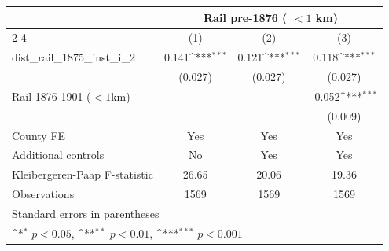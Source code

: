 {
\def\sym#1{\ifmmode^{#1}\else\(^{#1}\)\fi}
\begin{tabular}{l*{3}{c}}
\toprule
                &\multicolumn{3}{c}{Rail pre-1876 ( $<1$ km)}            \\\cmidrule(lr){2-4}
                &\multicolumn{1}{c}{(1)}         &\multicolumn{1}{c}{(2)}         &\multicolumn{1}{c}{(3)}         \\
\midrule
dist\_rail\_1875\_inst\_i\_2&    0.141\sym{***}&    0.121\sym{***}&    0.118\sym{***}\\
                &  (0.027)         &  (0.027)         &  (0.027)         \\
Rail 1876-1901 ($<1$km)&                  &                  &   -0.052\sym{***}\\
                &                  &                  &  (0.009)         \\
County FE       &      Yes         &      Yes         &      Yes         \\
Additional controls &       No         &      Yes         &      Yes         \\
\midrule
Kleibergeren-Paap F-statistic&    26.65         &    20.06         &    19.36         \\
Observations    &     1569         &     1569         &     1569         \\
\bottomrule
\multicolumn{4}{l}{\footnotesize Standard errors in parentheses}\\
\multicolumn{4}{l}{\footnotesize \sym{*} \(p<0.05\), \sym{**} \(p<0.01\), \sym{***} \(p<0.001\)}\\
\end{tabular}
}
